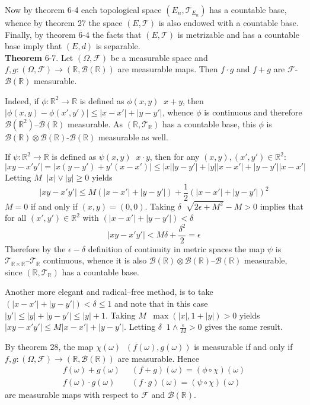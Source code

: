 \documentclass[a4paper]{article}
\newcommand{\brac}[1]{\left ( #1 \right )}
\newcommand{\abs}[1]{\left | #1 \right |}
\newcommand{\Real}{\mathbb{R}}
\newcommand{\Tcal}{\mathcal{T}}
\newcommand{\Fcal}{\mathcal{F}}
\newcommand{\borel}[1]{\mathcal{B}\brac{#1}}
\newcommand{\defn}{\mathop{\overset{\Delta}{=}}\nolimits}
\begin{document}
Now by theorem 6-4 each topological space $\brac{E_n, \Tcal_{E_n}}$ has a countable base, whence by theorem 27 the space $\brac{E, \Tcal}$ is also endowed with a countable base. Finally, by theorem 6-4 the facts that $\brac{E, \Tcal}$ is metrizable and has a countable base imply that $\brac{E,d}$ is separable.\\

\label{thm:alt_produc_and_sum_measurable} \noindent \textbf{Theorem} 6-7.
Let $\brac{\Omega, \Fcal}$ be a measurable space and $f,g:\brac{\Omega, \Fcal}\to \brac{\Real, \borel{\Real}}$ are measurable maps. Then $f\cdot g$ and $f+g$ are $\Fcal$-$\borel{\Real}$ measurable.

Indeed, if $\phi:\Real^2\to \Real$ is defined as $\phi\brac{x,y}\defn x+y$, then $\abs{\phi\brac{x,y}-\phi\brac{x',y'}}\leq \abs{x-x'}+\abs{y-y'}$, whence $\phi$ is continuous and therefore $\borel{\Real^2}$--$\borel{\Real}$ measurable. As $\brac{\Real, \Tcal_\Real}$ has a countable base, this $\phi$ is $\borel{\Real}\otimes \borel{\Real}$-$\borel{\Real}$ measurable as well.

If $\psi:\Real^2\to \Real$ is defined as $\psi\brac{x,y}\defn x\cdot y$, then for any $\brac{x,y}, \brac{x',y'}\in \Real^2$: \[ \abs{ xy - x'y' } = \abs{ x\brac{y - y'} + y'\brac{x - x'} } \leq \abs{ x } \abs{y - y'} + \abs{y}\abs{x - x'} + \abs{y - y'}\abs{x - x'}\] Letting $M \defn \abs{x} \vee \abs{y}\geq 0$ yields \[\abs{ xy - x'y' }\leq M \brac{ \abs{x - x'} + \abs{y - y'} } + \frac{1}{2}\brac{ \abs{x - x'} + \abs{y - y'} }^2\] $M=0$ if and only if $\brac{x,y} = \brac{0,0}$. Taking $\delta \defn \sqrt{2\epsilon+M^2}-M>0$ implies that for all $\brac{x',y'}\in \Real^2$ with $\brac{ \abs{x - x'} + \abs{y - y'} } < \delta$ \[ \abs{ xy - x'y' } < M\delta +\frac{\delta^2}{2} = \epsilon\] Therefore by the $\epsilon-\delta$ definition of continuity in metric spaces the map $\psi$ is $\Tcal_{\Real\times \Real}$--$\Tcal_\Real$ continuous, whence it is also $\borel{\Real}\otimes \borel{\Real}$--$\borel{\Real}$ measurable, since $\brac{\Real, \Tcal_\Real}$ has a countable base.

Another more elegant and radical--free method, is to take $\brac{ \abs{x - x'} + \abs{y - y'} } < \delta\leq 1$ and note that in this case $\abs{y'}\leq \abs{y}+\abs{y - y'}\leq \abs{y}+1$. Taking $M\defn \max\brac{ \abs{x}, 1+\abs{y} }> 0$ yields $\abs{xy-x'y'} \leq M\abs{x - x'} + \abs{y - y'}$. Letting $\delta \defn 1 \wedge \frac{\epsilon}{M}>0$ gives the same result.

By theorem 28, the map $\chi\brac{\omega}\defn\brac{f\brac{\omega}, g\brac{\omega}}$ is measurable if and only if $f,g:\brac{\Omega, \Fcal}\to \brac{\Real, \borel{\Real}}$ are measurable. Hence \begin{align*}f\brac{\omega}+g\brac{\omega} &\defn \brac{f+g}\brac{\omega} = \brac{\phi\circ\chi}\brac{\omega}\\ f\brac{\omega}\cdot g\brac{\omega} &\defn \brac{f\cdot g}\brac{\omega} = \brac{\psi\circ\chi}\brac{\omega}\end{align*} are measurable maps with respect to $\Fcal$ and $\borel{\Real}$.\\
\end{document}
